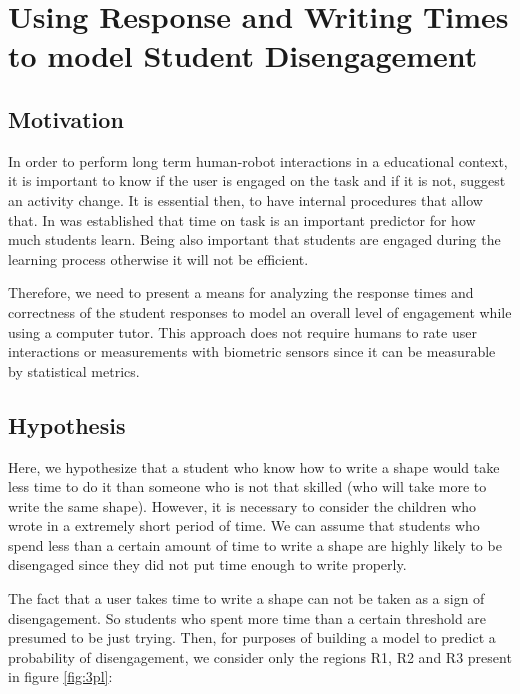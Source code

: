 \chapter{Using Response and Writing Times to model Student Disengagement} \label{chap:engagementModel}

\section{Motivation}

In order to perform long term human-robot interactions in a educational context, it is important to know if the user is engaged on the task and if it is not, suggest an activity change. It is essential then, to have internal procedures that allow that. In \cite{joseph2005engagement} was established that time on task is an important predictor for how much students learn. Being also important that students are engaged during the learning process otherwise it will not be efficient. 

Therefore, we need to present a means for analyzing the response times and correctness of the student responses to model an overall level of engagement while using a computer tutor. This approach does not require humans to rate user interactions or measurements with biometric sensors since it can be measurable by statistical metrics. 

\section{Hypothesis}

Here, we hypothesize that a student who know how to write a shape would take less time to do it than someone who is not that skilled (who will take more to write the same shape). However, it is necessary to consider the children who wrote in a extremely short period of time. We can assume that students who spend less than a certain amount of time to write a shape are highly likely to be disengaged since they did not put time enough to write properly.

The fact that a user takes time to write a shape can not be taken as a sign of disengagement. So students who spent more time than a certain threshold are presumed to be just trying. Then, for purposes of building a model to predict a probability of disengagement, we consider only the regions R1, R2 and R3 present in figure \ref{fig:3pl}:

\vspace{5mm} %

